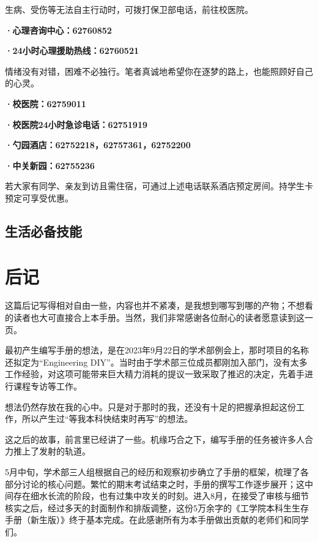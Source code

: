 \documentclass[11pt,oneside]{book}
\begin{document}
生病、受伤等无法自主行动时，可拨打保卫部电话，前往校医院。

\vspace{20pt}

\textbf{·心理咨询中心：62760852}

\textbf{·24小时心理援助热线：62760521}

情绪没有对错，困难不必独行。笔者真诚地希望你在逐梦的路上，也能照顾好自己的心灵。

\vspace{20pt}

\textbf{·校医院：62759011}

\textbf{·校医院24小时急诊电话：62751919}

\textbf{·勺园酒店：62752218，62757361，62752200}

\textbf{·中关新园：62755236}

若大家有同学、亲友到访且需住宿，可通过上述电话联系酒店预定房间。持学生卡预定可享受优惠。

\section{生活必备技能}

\backmatter

\chapter*{后记}
这篇后记写得相对自由一些，内容也并不紧凑，是我想到哪写到哪的产物；不想看的读者也大可直接合上本手册。当然，我们非常感谢各位耐心的读者愿意读到这一页。

最初产生编写手册的想法，是在2023年9月22日的学术部例会上，那时项目的名称还拟定为“Engineering DIY”。当时由于学术部三位成员都刚加入部门，没有太多工作经验，对这项可能带来巨大精力消耗的提议一致采取了推迟的决定，先着手进行课程专访等工作。

想法仍然存放在我的心中。只是对于那时的我，还没有十足的把握承担起这份工作，所以产生过“等我本科快结束时再写”的想法。

这之后的故事，前言里已经讲了一些。机缘巧合之下，编写手册的任务被许多人合力推上了发射的轨道。

5月中旬，学术部三人组根据自己的经历和观察初步确立了手册的框架，梳理了各部分讨论的核心问题。繁忙的期末考试结束之时，手册的撰写工作逐步展开；这中间存在细水长流的阶段，也有过集中攻关的时刻。进入8月，在接受了审核与细节核实之后，经过多天的封面制作和排版调整，这份5万余字的《工学院本科生生存手册（新生版）》终于基本完成。在此感谢所有为本手册做出贡献的老师们和同学们。
\end{document}
